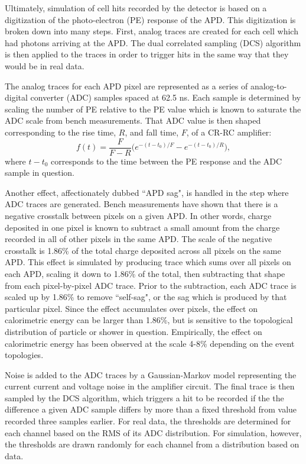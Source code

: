 Ultimately, simulation of cell hits recorded by the detector is based on a digitization of the photo-electron (PE) response of the APD.  This digitization is broken down into many steps.  First, analog traces are created for each cell which had photons arriving at the APD.  The dual correlated sampling (DCS) algorithm is then applied to the traces in order to trigger hits in the same way that they would be in real data.

The analog traces for each APD pixel are represented as a series of analog-to-digital converter (ADC) samples spaced at 62.5 ns.  Each sample is determined by scaling the number of PE relative to the PE value which is known to saturate the ADC scale from bench measurements.  That ADC value is then shaped corresponding to the rise time, $R$, and fall time, $F$, of a CR-RC amplifier:
\begin{equation}
f(t) = \frac{F}{F − R}\bigg (e^{-(t-t_0)/F} - e^{-(t-t_0)/R}\bigg ),
\end{equation}
where $t-t_0$ corresponds to the time between the PE response and the ADC sample in question.

Another effect, affectionately dubbed ``APD sag", is handled in the step where ADC traces are generated.  Bench measurements have shown that there is a negative crosstalk between pixels on a given APD.  In other words, charge deposited in one pixel is known to subtract a small amount from the charge recorded in all of other pixels in the same APD.  The scale of the negative crosstalk is 1.86\% of the total charge deposited across all pixels on the same APD.  This effect is simulated by producing trace which sums over all pixels on each APD, scaling it down to 1.86\% of the total, then subtracting that shape from each pixel-by-pixel ADC trace.  Prior to the subtraction, each ADC trace is scaled up by 1.86\% to remove ``self-sag", or the sag which is produced by that particular pixel.  Since the effect accumulates over pixels, the effect on calorimetric energy can be larger than 1.86\%, but is sensitive to the topological distribution of particle or shower in question.  Empirically, the effect on calorimetric energy has been observed at the scale 4-8\% depending on the event topologies.

Noise is added to the ADC traces by a Gaussian-Markov model representing the current current and voltage noise in the amplifier circuit.  The final trace is then sampled by the DCS algorithm, which triggers a hit to be recorded if the the difference a given ADC sample differs by more than a fixed threshold from value recorded three samples earlier.  For real data, the thresholds are determined for each channel based on the RMS of its ADC distribution.  For simulation, however, the thresholds are drawn randomly for each channel from a distribution based on data.

